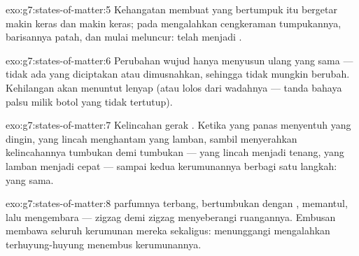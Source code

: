 \begin{solution}{exo:g7:states-of-matter:5}
Kehangatan membuat  yang bertumpuk itu bergetar makin keras dan
makin keras; pada   mengalahkan cengkeraman
tumpukannya, barisannya patah, dan  mulai meluncur:  telah menjadi .
\end{solution}

\begin{solution}{exo:g7:states-of-matter:6}
Perubahan wujud hanya menyusun ulang  yang sama --- tidak ada
yang diciptakan atau dimusnahkan, sehingga  tidak mungkin
berubah. Kehilangan  akan menuntut  lenyap (atau lolos
dari wadahnya --- tanda bahaya palsu milik botol yang tidak tertutup).
\end{solution}

\begin{solution}{exo:g7:states-of-matter:7}
Kelincahan gerak . Ketika yang panas menyentuh yang dingin,
 yang lincah menghantam  yang lamban, sambil menyerahkan
kelincahannya tumbukan demi tumbukan --- yang lincah menjadi tenang,
yang lamban menjadi cepat --- sampai kedua kerumunannya berbagi satu
langkah:  yang sama.
\end{solution}

\begin{solution}{exo:g7:states-of-matter:8}
 parfumnya terbang, bertumbukan dengan  ,
memantul, lalu mengembara --- zigzag demi zigzag menyeberangi
ruangannya. Embusan  membawa seluruh kerumunan mereka
sekaligus: menunggangi  mengalahkan terhuyung-huyung menembus
kerumunannya.
\end{solution}

